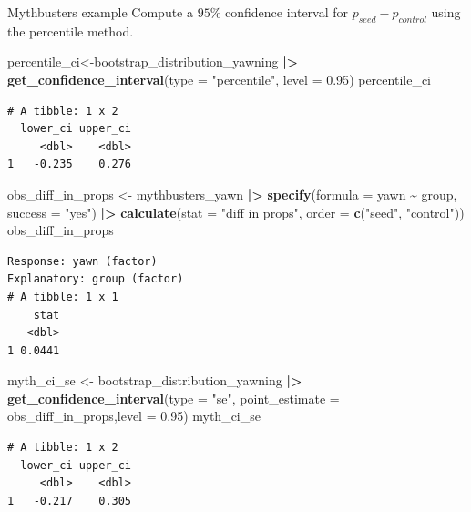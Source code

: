 \documentclass[
  ignorenonframetext,
]{beamer}
\newenvironment{Shaded}{\begin{snugshade}}{\end{snugshade}}
\newcommand{\AttributeTok}[1]{\textcolor[rgb]{0.13,0.29,0.53}{#1}}
\newcommand{\FloatTok}[1]{\textcolor[rgb]{0.00,0.00,0.81}{#1}}
\newcommand{\FunctionTok}[1]{\textcolor[rgb]{0.13,0.29,0.53}{\textbf{#1}}}
\newcommand{\NormalTok}[1]{#1}
\newcommand{\OtherTok}[1]{\textcolor[rgb]{0.56,0.35,0.01}{#1}}
\newcommand{\SpecialCharTok}[1]{\textcolor[rgb]{0.81,0.36,0.00}{\textbf{#1}}}
\newcommand{\StringTok}[1]{\textcolor[rgb]{0.31,0.60,0.02}{#1}}
\begin{document}
\begin{frame}[fragile]{Mythbusters example}
\protect\hypertarget{mythbusters-example-3}{}
Compute a \(95\%\) confidence interval for \(p_{seed}-p_{control}\)
using the percentile method.

\tiny

\begin{Shaded}
\begin{Highlighting}[]
\NormalTok{percentile\_ci}\OtherTok{\textless{}{-}}\NormalTok{bootstrap\_distribution\_yawning }\SpecialCharTok{|\textgreater{}} 
  \FunctionTok{get\_confidence\_interval}\NormalTok{(}\AttributeTok{type =} \StringTok{"percentile"}\NormalTok{, }\AttributeTok{level =} \FloatTok{0.95}\NormalTok{)}
\NormalTok{percentile\_ci}
\end{Highlighting}
\end{Shaded}

\begin{verbatim}
# A tibble: 1 x 2
  lower_ci upper_ci
     <dbl>    <dbl>
1   -0.235    0.276
\end{verbatim}

\begin{Shaded}
\begin{Highlighting}[]
\NormalTok{obs\_diff\_in\_props }\OtherTok{\textless{}{-}}\NormalTok{ mythbusters\_yawn }\SpecialCharTok{|\textgreater{}} 
  \FunctionTok{specify}\NormalTok{(}\AttributeTok{formula =}\NormalTok{ yawn }\SpecialCharTok{\textasciitilde{}}\NormalTok{ group, }\AttributeTok{success =} \StringTok{"yes"}\NormalTok{) }\SpecialCharTok{|\textgreater{}} 
  \FunctionTok{calculate}\NormalTok{(}\AttributeTok{stat =} \StringTok{"diff in props"}\NormalTok{, }\AttributeTok{order =} \FunctionTok{c}\NormalTok{(}\StringTok{"seed"}\NormalTok{, }\StringTok{"control"}\NormalTok{))}
\NormalTok{obs\_diff\_in\_props}
\end{Highlighting}
\end{Shaded}

\begin{verbatim}
Response: yawn (factor)
Explanatory: group (factor)
# A tibble: 1 x 1
    stat
   <dbl>
1 0.0441
\end{verbatim}

\begin{Shaded}
\begin{Highlighting}[]
\NormalTok{myth\_ci\_se }\OtherTok{\textless{}{-}}\NormalTok{ bootstrap\_distribution\_yawning }\SpecialCharTok{|\textgreater{}} 
  \FunctionTok{get\_confidence\_interval}\NormalTok{(}\AttributeTok{type =} \StringTok{"se"}\NormalTok{, }\AttributeTok{point\_estimate =}\NormalTok{ obs\_diff\_in\_props,}\AttributeTok{level =} \FloatTok{0.95}\NormalTok{)}
\NormalTok{myth\_ci\_se}
\end{Highlighting}
\end{Shaded}

\begin{verbatim}
# A tibble: 1 x 2
  lower_ci upper_ci
     <dbl>    <dbl>
1   -0.217    0.305
\end{verbatim}

\normalsize
\end{frame}
\end{document}
